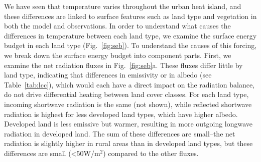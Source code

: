 We have seen that temperature varies throughout the urban heat island, and these differences are linked to surface features such as land type and vegetation in both the model and observations. 
In order to understand what causes the differences in temperature between each land type, we examine the surface energy budget in each land type (Fig.~\ref{fig:seb}). 
 To understand the causes of this forcing, we break down the surface energy budget into component parts. First, we examine the net radiation fluxes in Fig.~\ref{fig:seb}a. 
These fluxes differ little by land type, indicating that differences in emissivity or in albedo (see Table~\ref{tab:lcc}), which would each have a direct impact on the radiation balance, do not drive differential heating between land cover classes.
For each land type, incoming shortwave radiation is the same (not shown), while reflected shortwave radiation is highest for less developed land types, which have higher albedo. 
Developed land is less emissive but warmer, resulting in more outgoing longwave radiation in developed land. %
The sum of these differences are small--the net radiation is slightly higher in rural areas than in developed land types, but these differences are small (<$50$W/m$^2$) compared to the other fluxes. 

